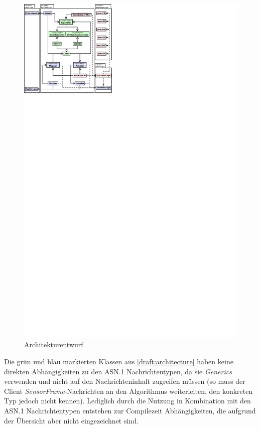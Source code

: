 \begin{figure}[H]
	\centering
	\includegraphics[width=1.9\textwidth]{dia/architecture}
	\caption{Architekturentwurf}
	\label{draft:architecture}
\end{figure}

Die grün und blau markierten Klassen aus \autoref{draft:architecture} haben keine direkten Abhängigkeiten zu den ASN.1 Nachrichtentypen, da sie \textit{Generics} verwenden und nicht auf den Nachrichteninhalt zugreifen müssen (so muss der Client \textit{SensorFrame}-Nachrichten an den Algorithmus weiterleiten, den konkreten Typ jedoch nicht kennen).
Lediglich durch die Nutzung in Kombination mit den ASN.1 Nachrichtentypen entstehen zur Compilezeit Abhängigkeiten, die aufgrund der Übersicht aber nicht eingezeichnet sind. 

